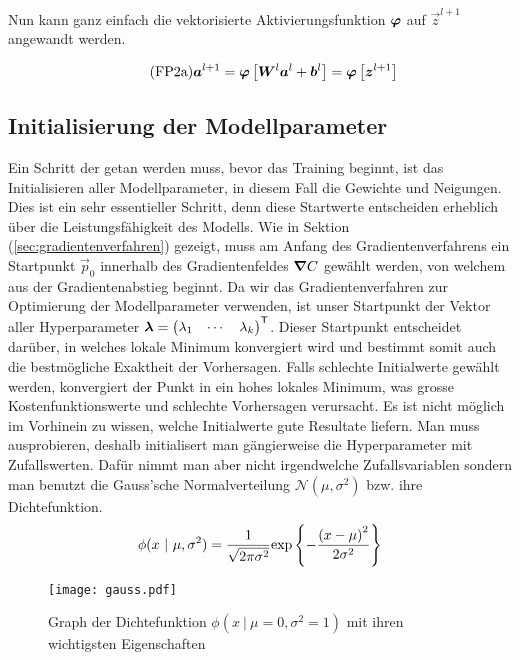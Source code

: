Nun kann ganz einfach die vektorisierte Aktivierungsfunktion $\bm{\varphi}$ auf
$\vec{z}^{l+1}$ angewandt werden.

\begin{equation}\tag{FP2a}\label{eq:aktivierung_matrix}
  \bm{a}^{l+1} = \bm{\varphi} \left[\bm{W}^{l} \bm{a}^{l} + \bm{b}^{l} \right] = \bm{\varphi} \left[ \bm{z}^{l+1} \right]
\end{equation}

\para{}
\cite{Nielsen}

\subsection{Initialisierung der Modellparameter}\label{sec:parameter_initalisieren}
Ein Schritt der getan werden muss, bevor das Training beginnt, ist das
Initialisieren aller Modellparameter, in diesem Fall die Gewichte und Neigungen.
Dies ist ein sehr essentieller Schritt, denn diese Startwerte entscheiden
erheblich über die Leistungsfähigkeit des Modells.
\para{}
Wie in Sektion (\ref{sec:gradientenverfahren}) gezeigt, muss am Anfang des
Gradientenverfahrens ein Startpunkt $\vec{p}_0$ innerhalb des Gradientenfeldes
$\bm{\nabla}C$ gewählt werden, von welchem aus der Gradientenabstieg beginnt.
Da wir das Gradientenverfahren zur Optimierung der Modellparameter verwenden,
ist unser Startpunkt der Vektor aller Hyperparameter
$\bm{\lambda} = \begin{pmatrix} \lambda_1 & \cdots & \lambda_k \end{pmatrix}^{\mathsf{T}}$.
Dieser Startpunkt entscheidet darüber, in welches lokale Minimum konvergiert
wird und bestimmt somit auch die bestmögliche Exaktheit der Vorhersagen. Falls
schlechte Initialwerte gewählt werden, konvergiert der Punkt in ein hohes lokales
Minimum, was grosse Kostenfunktionswerte und schlechte Vorhersagen verursacht.
\para{}
Es ist nicht möglich im Vorhinein zu wissen, welche Initialwerte gute Resultate
liefern. Man muss ausprobieren, deshalb initialisert man gängierweise die
Hyperparameter mit Zufallswerten. Dafür nimmt man aber nicht irgendwelche
Zufallsvariablen sondern man benutzt die Gauss'sche Normalverteilung
$\mathcal{N}(\mu,\sigma^2)$ bzw. ihre Dichtefunktion.
\[\ds \phi(x\ |\ \mu,\sigma^2) = \frac{1}{\sqrt{2\pi\sigma^2}} \text{exp} \left\{-\frac{{(x-\mu)}^2}{2\sigma^2}\right\} \]
\para{}
\begin{figure}[h!]
  \centering
  \texttt{[image: gauss.pdf]}
  \caption{Graph der Dichtefunktion $\phi(x\ |\ \mu=0,\sigma^2=1)$ mit ihren
    wichtigsten Eigenschaften}%
\end{figure}
